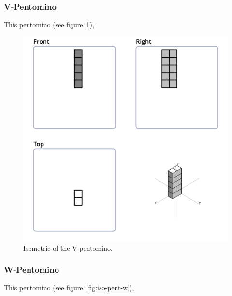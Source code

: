 \subsubsection{V-Pentomino}
\label{sec:v-pentomino}
This pentomino (see figure~\ref{fig:iso-pent-v}),


\begin{figure}
	\centering
	\includegraphics[scale=0.3]{iso_diagrams/o.png}
	\caption{Isometric of the V-pentomino.}
  \label{fig:iso-pent-v}
\end{figure}
\subsubsection{W-Pentomino}
\label{sec:w-pentomino}
This pentomino (see figure~\ref{fig:iso-pent-w}),


